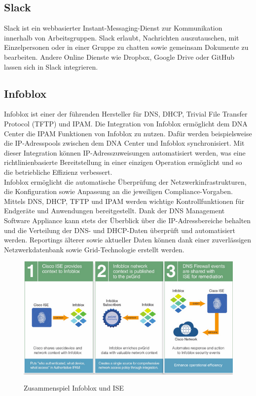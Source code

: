 \subsection{Slack}
Slack ist ein webbasierter Instant-Messaging-Dienst zur Kommunikation innerhalb von Arbeitsgruppen. Slack erlaubt, Nachrichten auszutauschen, mit Einzelpersonen oder in einer Gruppe zu chatten sowie gemeinsam Dokumente zu bearbeiten. Andere Online Dienste wie Dropbox, Google Drive oder GitHub lassen sich in Slack integrieren.

\subsection{Infoblox}
Infoblox ist einer der führenden Hersteller für DNS, DHCP, Trivial File Transfer Protocol (TFTP) und IPAM. Die Integration von Infoblox ermöglicht dem DNA Center die IPAM Funktionen von Infoblox zu nutzen. Dafür werden beispielsweise die IP-Adresspools zwischen dem DNA Center und Infoblox synchronisiert. Mit dieser Integration können IP-Adresszuweisungen automatisiert werden, was eine richtlinienbasierte Bereitstellung in einer einzigen Operation ermöglicht und so die betriebliche Effizienz verbessert. \\
Infoblox ermöglicht die automatische Überprüfung der Netzwerkinfrastrukturen, die Konfiguration sowie Anpassung an die jeweiligen Compliance-Vorgaben. Mittels DNS, DHCP, TFTP und IPAM werden wichtige Kontrollfunktionen für Endgeräte und Anwendungen bereitgestellt. Dank der DNS Management Software Appliance kann stets der Überblick über die IP-Adressbereiche behalten und die Verteilung der DNS- und DHCP-Daten überprüft und automatisiert werden. Reportings älterer sowie aktueller Daten können dank einer zuverlässigen Netzwerkdatenbank sowie Grid-Technologie erstellt werden.\cite{infoblox} \\

\begin{figure}[H]
	\centering
	\includegraphics[width=0.7\linewidth]{img/infoblox-ise.png}\\[1px]
	\caption{Zusammenspiel Infoblox und ISE \cite{infoblox-communityblog}}
	\label{fig:Zusammenspiel Infoblox und ISE}
\end{figure}


